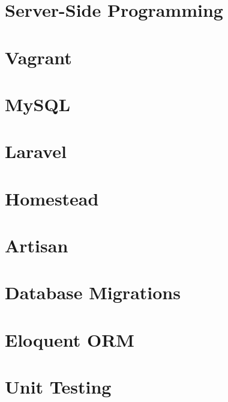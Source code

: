 \documentclass[b5paper,openany]{book}
\begin{document}
\tp


\tableofcontents




\chapter{Server-Side Programming}


\chapter{Vagrant}


\chapter{MySQL}


\chapter{Laravel}


\chapter{Homestead}


\chapter{Artisan}


\chapter{Database Migrations}


\chapter{Eloquent ORM}


\chapter{Unit Testing}

\end{document}
